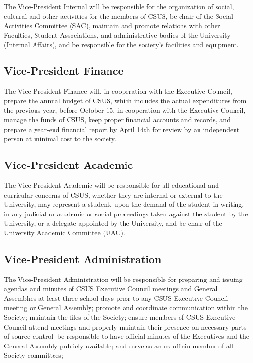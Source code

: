The Vice-President Internal will be responsible for the organization of
social, cultural and other activities for the members of CSUS, be chair
of the Social Activities Committee (SAC), maintain and promote relations
with other Faculties, Student Associations, and administrative bodies of
the University (Internal Affairs), and be responsible for the society's
facilities and equipment.

\subsection{Vice-President Finance}\label{vice-president-finance}

The Vice-President Finance will, in cooperation with the Executive
Council, prepare the annual budget of CSUS, which includes the actual
expenditures from the previous year, before October 15, in cooperation
with the Executive Council, manage the funds of CSUS, keep proper
financial accounts and records, and prepare a year-end financial report
by April 14th for review by an independent person at minimal cost to the
society.

\subsection{Vice-President Academic}\label{vice-president-academic}

The Vice-President Academic will be responsible for all educational and
curricular concerns of CSUS, whether they are internal or external to
the University, may represent a student, upon the demand of the student
in writing, in any judicial or academic or social proceedings taken
against the student by the University, or a delegate appointed by the
University, and be chair of the University Academic Committee (UAC).

\subsection{Vice-President
Administration}\label{vice-president-administration}

The Vice-President Administration will be responsible for preparing and
issuing agendas and minutes of CSUS Executive Council meetings and
General Assemblies at least three school days prior to any CSUS
Executive Council meeting or General Assembly; promote and coordinate
communication within the Society; maintain the files of the Society;
ensure members of CSUS Executive Council attend meetings and properly
maintain their presence on necessary parts of source control; be
responsible to have official minutes of the Executives and the General
Assembly publicly available; and serve as an ex-officio member of all
Society committees;

